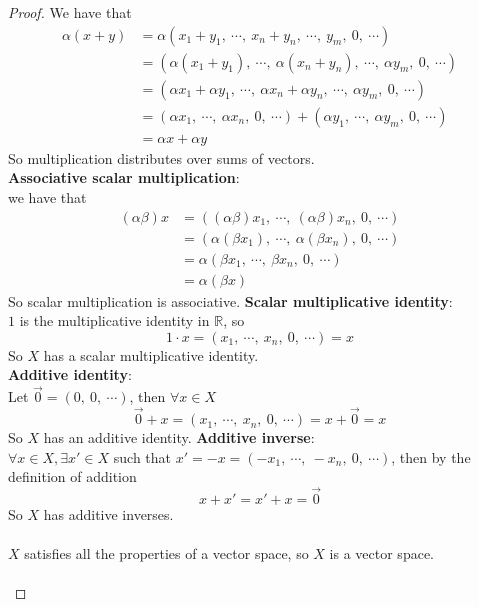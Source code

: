 \documentclass{article}
\newcommand{\parens}[1]{\left(#1\right)}
\newcommand{\R}{\mathbb{R}}
\begin{document}
\begin{proof}
    We have that
    \begin{align*}
    \alpha(x+y) &= \alpha\parens{x_1 + y_1,\ \cdots,\ x_n + y_n,\ 
    \cdots,\ y_m,\ 0,\ \cdots} \\
    &= \parens{\alpha(x_1 + y_1),\ \cdots,\ \alpha(x_n + y_n),\ 
    \cdots,\ \alpha y_m,\ 0,\ \cdots} \\
    &= \parens{\alpha x_1 + \alpha y_1,\ \cdots,\ 
    \alpha x_n + \alpha y_n,\ \cdots,\ \alpha y_m,\ 0,\ \cdots} \\
    &= \parens{\alpha x_1,\ \cdots,\ \alpha x_n,\ 0,\ \cdots}  +
    \parens{\alpha y_1,\ \cdots,\ \alpha y_m,\ 0,\ \cdots} \\
    &= \alpha x + \alpha y
    \end{align*}
    So multiplication distributes over sums of vectors.\\
    \textbf{Associative scalar multiplication}:\\
    we have that
    \begin{align*}
    (\alpha\beta)x &= \parens{(\alpha\beta) x_1,\ \cdots,\ (\alpha
    \beta)x_n,\ 0,\ \cdots} \\
    &= \parens{\alpha(\beta x_1),\ \cdots,\ \alpha
    (\beta x_n),\ 0,\ \cdots} \\
    &= \alpha\parens{\beta x_1,\ \cdots,\ 
    \beta x_n,\ 0,\ \cdots} \\
    &= \alpha\parens{\beta x}
    \end{align*}
    So scalar multiplication is associative.
    \textbf{Scalar multiplicative identity}:\\
    $1$ is the multiplicative identity in $\R$, so
    $$1\cdot x = \parens{x_1,\ \cdots,\ x_n,\ 0,\ \cdots} = x$$
    So $X$ has a scalar multiplicative identity.\\
    \textbf{Additive identity}:\\
    Let $\vec{0} = \parens{0,\ 0,\ \cdots}$, then $\forall x \in X$
    $$\vec{0} 
    + x = \parens{x_1,\ \cdots,\ x_n,\ 0,\ \cdots} = x +
    \vec{0} = x$$
    So $X$ has an additive identity.
    \textbf{Additive inverse}:\\
    $\forall x \in X, \exists x' \in X$ such that $x' = -x = 
    \parens{-x_1,\ \cdots,\ -x_n,\ 0,\ \cdots}$, then by the 
    definition of addition
    $$x + x' = x' + x = \vec{0}$$
    So $X$ has additive inverses.\\\\
    $X$ satisfies all the properties of a vector space, so 
    $X$ is a vector space.\\\\
    


\end{proof}
\end{document}

